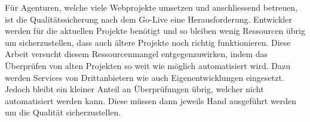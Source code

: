 Für Agenturen, welche viele Webprojekte umsetzen und anschliessend betreuen, ist die Qualitätssicherung nach dem Go-Live eine Herausforderung. Entwickler werden für die aktuellen Projekte benötigt und so bleiben wenig Ressourcen übrig um sicherzustellen, dass auch ältere Projekte noch richtig funktionieren. Diese Arbeit versucht diesem Ressourcenmangel entgegenzuwirken, indem das Überprüfen von alten Projekten so weit wie möglich automatisiert wird. Dazu werden Services von Drittanbietern wie auch Eigenentwicklungen eingesetzt. Jedoch bleibt ein kleiner Anteil an Überprüfungen übrig, welcher nicht automatisiert werden kann. Diese müssen dann jeweils Hand ausgeführt werden um die Qualität sicherzustellen.